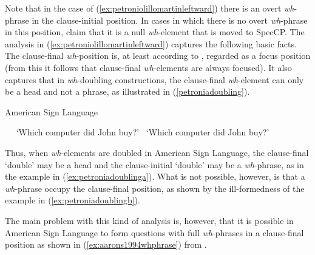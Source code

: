 \noindent Note that in the case of (\ref{ex:petroniolillomartinleftward}) there is an overt \textit{wh}-phrase in the clause-initial position. In cases in which there is no overt \textit{wh}-phrase in this position, \citet{petronio1997} claim that it is a null \textit{wh}-element that is moved to SpecCP. The analysis in (\ref{ex:petroniolillomartinleftward}) captures the following basic facts. The clause-final \textit{wh}-position is, at least according to \citet{petronio1997}, regarded as a focus position (from this it follows that clause-final \textit{wh}-elements are always focused). It also captures that in \textit{wh}-doubling constructions, the clause-final \textit{wh}-element can only be a head and not a phrase, as illustrated in (\ref{petroniadoubling}).


\begin{exe}
\ex American Sign Language \citep[33]{petronio1997}\label{petroniadoubling}\begin{xlist} 
\ex \textcolor{white}{*}
\glt \textcolor{white}{*}`Which computer did John buy?' \label{ex:petroniadoublinga}
\ex * 
\glt \textcolor{white}{*}`Which computer did John buy?' \label{ex:petroniadoublingb} 
\end{xlist}
\end{exe}

\noindent Thus, when \textit{wh}-elements are doubled in American Sign Language, the clause-final `double' may be a head and the clause-initial `double' may be a \textit{wh}-phrase, as in the example in (\ref{ex:petroniadoublinga}). What is not possible, however, is that a \textit{wh}-phrase occupy the clause-final position, as shown by the ill-formedness of the example in (\ref{ex:petroniadoublingb}).

The main problem with this kind of analysis is, however, that it is possible in American Sign Language to form questions with full \textit{wh}-phrases in a clause-final position as shown in (\ref{ex:aarons1994whphrase}) from \citet[92]{aarons1994aspects}.

